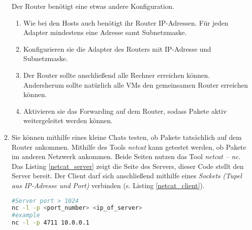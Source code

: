 \documentclass[paper=a4,fontsize=11pt]{scrartcl}%
\begin{document}
\begin{enumerate}
	Der Router benötigt eine etwas andere Konfiguration. 
	\begin{enumerate}
		\item Wie bei den Hosts auch benötigt ihr Router IP-Adressen. Für jeden Adapter mindestens eine Adresse samt Subnetzmaske. 
		\item Konfigurieren sie die Adapter des Routers mit IP-Adresse und Subnetzmaske.
		\item Der Router sollte anschließend alle Rechner erreichen können. Andersherum sollte natürlich alle VMs den gemeinsamen Router erreichen können.
		\item Aktivieren sie das Forwarding auf dem Router, sodass Pakete aktiv weitergeleitet werden können.
		\end{enumerate}
		\item Sie können mithilfe eines kleine Chats testen, ob Pakete tatsächlich auf dem Router ankommen. Mithilfe des Tools \emph{netcat} kann getestet werden, ob Pakete im anderen Netzwerk ankommen. Beide Seiten nutzen das Tool \emph{netcat -- nc}. Das Listing \ref{netcat_server} zeigt die Seite des Servers, dieser Code stellt den Server bereit. Der Client darf sich anschließend mithilfe eines \emph{Sockets (Tupel aus IP-Adresse und Port)} verbinden (s. Listing \ref{netcat_client}). 
		\begin{lstlisting}[style=Bash, language=Bash, label={netcat_server}]
#Server port > 1024 
nc -l -p <port_number> <ip_of_server>
#example
nc -l -p 4711 10.0.0.1
		\end{lstlisting}
		

\end{enumerate}
\end{document}
